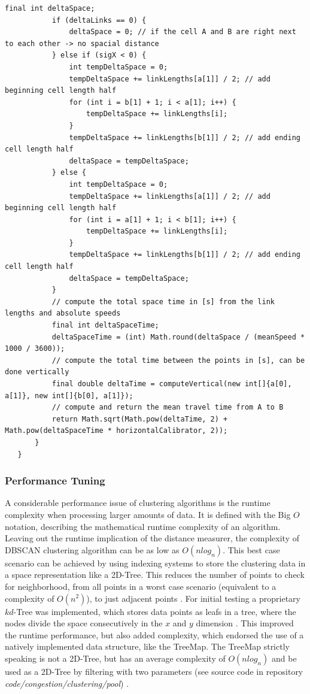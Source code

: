 \begin{lstlisting}[basicstyle=\tiny, style=java, caption={Implementation of \textit{diagonal distance calculation}}, label=lst:distance_calc_diagonal]
		   final int deltaSpace;
		   if (deltaLinks == 0) {
			   deltaSpace = 0; // if the cell A and B are right next to each other -> no spacial distance
		   } else if (sigX < 0) {
			   int tempDeltaSpace = 0;
			   tempDeltaSpace += linkLengths[a[1]] / 2; // add beginning cell length half
			   for (int i = b[1] + 1; i < a[1]; i++) {
				   tempDeltaSpace += linkLengths[i];
			   }
			   tempDeltaSpace += linkLengths[b[1]] / 2; // add ending cell length half
			   deltaSpace = tempDeltaSpace;
		   } else {
			   int tempDeltaSpace = 0;
			   tempDeltaSpace += linkLengths[a[1]] / 2; // add beginning cell length half
			   for (int i = a[1] + 1; i < b[1]; i++) {
				   tempDeltaSpace += linkLengths[i];
			   }
			   tempDeltaSpace += linkLengths[b[1]] / 2; // add ending cell length half
			   deltaSpace = tempDeltaSpace;
		   }
		   // compute the total space time in [s] from the link lengths and absolute speeds
		   final int deltaSpaceTime;
		   deltaSpaceTime = (int) Math.round(deltaSpace / (meanSpeed * 1000 / 3600));
		   // compute the total time between the points in [s], can be done vertically
		   final double deltaTime = computeVertical(new int[]{a[0], a[1]}, new int[]{b[0], a[1]});
		   // compute and return the mean travel time from A to B
		   return Math.sqrt(Math.pow(deltaTime, 2) + Math.pow(deltaSpaceTime * horizontalCalibrator, 2));
	   }
   }
\end{lstlisting}

\subsubsection{Performance Tuning}
A considerable performance issue of clustering algorithms is the runtime complexity when processing larger amounts of data. It is defined with the Big $O$ notation, describing the mathematical runtime complexity of an algorithm. Leaving out the runtime implication of the distance measurer, the complexity of DBSCAN clustering algorithm can be as low as $O(nlog_n)$. This best case scenario can be achieved by using indexing systems to store the clustering data in a space representation like a 2D-Tree. This reduces the number of points to check for neighborhood, from all points in a worst case scenario (equivalent to a complexity of $O(n^2)$), to just adjacent points \parencite{Chauhan2020}. For initial testing a proprietary $kd$-Tree was implemented, which stores data points as leafs in a tree, where the nodes divide the space consecutively in the $x$ and $y$ dimension \parencite{Hucker2020,Dalitz2009}. This improved the runtime performance, but also added complexity, which endorsed the use of a natively implemented data structure, like the TreeMap. The TreeMap strictly speaking is not a 2D-Tree, but has an average complexity of $O(nlog_n)$ and be used as a 2D-Tree by filtering with two parameters (see source code in repository \textit{code/congestion/clustering/pool}) \parencite{Baeldung2020_1,Baeldung2020_2}.

